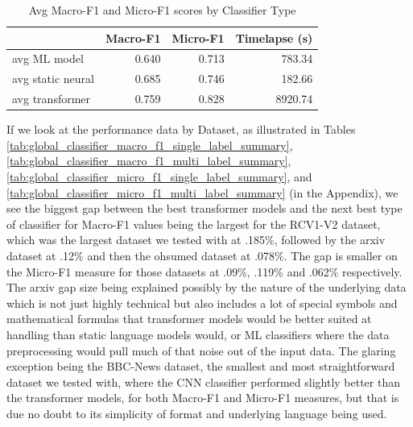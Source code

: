 \documentclass[final]{clv2025}
\begin{document}
\begin{table}[h!]
\centering
\small
\caption{Avg Macro-F1 and Micro-F1 scores by Classifier Type} %
\label{tab:summ_avg_macro_micro_f1} %
\begin{tabular}{lrrr} %
\toprule
 & \textbf{Macro-F1} & \textbf{Micro-F1} & \textbf{Timelapse (s)} \\
\midrule
avg ML model        & 0.640 & 0.713 &   783.34 \\
avg static neural   & 0.685 & 0.746 &   182.66 \\
avg transformer     & 0.759 & 0.828 &  8920.74 \\
\bottomrule
\end{tabular}
\end{table}

If we look at the performance data by Dataset, as illustrated in Tables \ref{tab:global_classifier_macro_f1_single_label_summary}, \ref{tab:global_classifier_macro_f1_multi_label_summary}, \ref{tab:global_classifier_micro_f1_single_label_summary}, and \ref{tab:global_classifier_micro_f1_multi_label_summary} (in the Appendix), we see the biggest gap between the best transformer models and the next best type of classifier for Macro-F1 values being the largest for the RCV1-V2 dataset, which was the largest dataset we tested with at .185\%, followed by the arxiv dataset at .12\% and then the ohsumed dataset at .078\%. The gap is smaller on the Micro-F1 measure for those datasets at .09\%, .119\% and .062\% respectively. The arxiv gap size being explained possibly by the nature of the underlying data which is not just highly technical but also includes a lot of special symbols and mathematical formulas that transformer models would be better suited at handling than static language models would, or ML classifiers where the data preprocessing would pull much of that noise out of the input data. The glaring exception being the BBC-News dataset, the smallest and most straightforward dataset we tested with, where the CNN classifier performed slightly better than the transformer models, for both Macro-F1 and Micro-F1 measures, but that is due no doubt to its simplicity of format and underlying language being used. 
\end{document}
